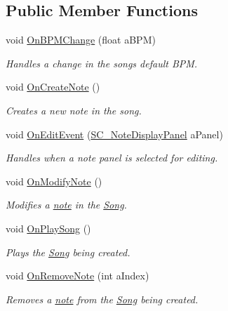 \subsection*{Public Member Functions}
\begin{DoxyCompactItemize}
\item 
void \hyperlink{group___s_c_m_handlers_gae5930497314c77bd9c52c083b2f3e82e}{On\+B\+P\+M\+Change} (float a\+B\+PM)
\begin{DoxyCompactList}\small\item\em Handles a change in the song\textquotesingle{}s default B\+PM. \end{DoxyCompactList}\item 
void \hyperlink{group___s_c_m_handlers_gaed512eb78e060a40616e6e31ce029440}{On\+Create\+Note} ()
\begin{DoxyCompactList}\small\item\em Creates a new note in the song. \end{DoxyCompactList}\item 
void \hyperlink{group___s_c_m_handlers_gacb552a4f02b22d7c10a8420eb1431201}{On\+Edit\+Event} (\hyperlink{class_s_c___note_display_panel}{S\+C\+\_\+\+Note\+Display\+Panel} a\+Panel)
\begin{DoxyCompactList}\small\item\em Handles when a note panel is selected for editing. \end{DoxyCompactList}\item 
void \hyperlink{group___s_c_m_handlers_gaf12d6326ad2175a51f688504372be784}{On\+Modify\+Note} ()
\begin{DoxyCompactList}\small\item\em Modifies a \hyperlink{group___music_structs_struct_music_1_1_combined_note}{note} in the \hyperlink{class_song}{Song}. \end{DoxyCompactList}\item 
void \hyperlink{group___s_c_m_handlers_gafb394a0b00c8f9c0959d901faf9131c7}{On\+Play\+Song} ()
\begin{DoxyCompactList}\small\item\em Plays the \hyperlink{class_song}{Song} being created. \end{DoxyCompactList}\item 
void \hyperlink{group___s_c_m_handlers_ga1f1e9a15a6c339282fb94085d4862605}{On\+Remove\+Note} (int a\+Index)
\begin{DoxyCompactList}\small\item\em Removes a \hyperlink{group___music_structs_struct_music_1_1_combined_note}{note} from the \hyperlink{class_song}{Song} being created. \end{DoxyCompactList}\item 

\end{DoxyCompactItemize}
